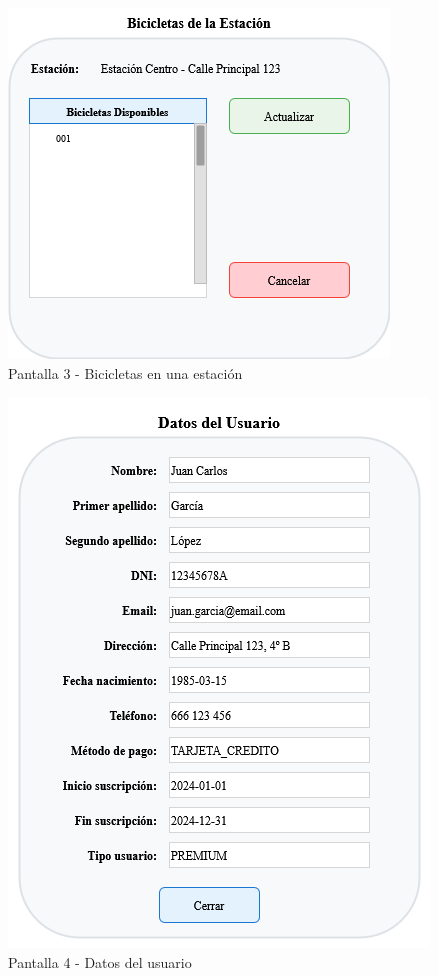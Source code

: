     \begin{figure}
        \centering
        \includegraphics{imagenes/bicifast - pantalla 3 -bicicletas en una estacion.drawio}
        \caption{Pantalla 3 - Bicicletas en una estación}
        \label{fig:bicifast---pantalla-3--bicicletas-en-una-estacion.drawio}
    \end{figure}

    \begin{figure}
        \centering
        \includegraphics{imagenes/bicifast - pantalla 4 -datos del usuario.drawio}
        \caption{Pantalla 4 - Datos del usuario}
        \label{fig:bicifast---pantalla-4--datos-del-usuario.drawio}
    \end{figure}

